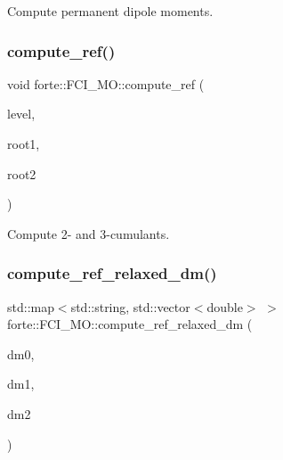 Compute permanent dipole moments. 

\mbox{\label{classforte_1_1_f_c_i___m_o_a6d3a3e8ba42f7d13c101dc893b9967c0}} 
\subsubsection{\texorpdfstring{compute\+\_\+ref()}{compute\_ref()}}
{\footnotesize\ttfamily void forte\+::\+F\+C\+I\+\_\+\+M\+O\+::compute\+\_\+ref (\begin{DoxyParamCaption}\item[{const int \&}]{level,  }\item[{size\+\_\+t}]{root1,  }\item[{size\+\_\+t}]{root2 }\end{DoxyParamCaption})\hspace{0.3cm}{\ttfamily [protected]}}



Compute 2-\/ and 3-\/cumulants. 

\mbox{\label{classforte_1_1_f_c_i___m_o_a112b3f3dc49523b7685610bb276f5b5e}} 
\subsubsection{\texorpdfstring{compute\+\_\+ref\+\_\+relaxed\+\_\+dm()}{compute\_ref\_relaxed\_dm()}\hspace{0.1cm}{\footnotesize\ttfamily [1/2]}}
{\footnotesize\ttfamily std\+::map$<$std\+::string, std\+::vector$<$double$>$ $>$ forte\+::\+F\+C\+I\+\_\+\+M\+O\+::compute\+\_\+ref\+\_\+relaxed\+\_\+dm (\begin{DoxyParamCaption}\item[{const std\+::vector$<$ double $>$ \&}]{dm0,  }\item[{std\+::vector$<$ ambit\+::\+Blocked\+Tensor $>$ \&}]{dm1,  }\item[{std\+::vector$<$ ambit\+::\+Blocked\+Tensor $>$ \&}]{dm2 }\end{DoxyParamCaption})}

